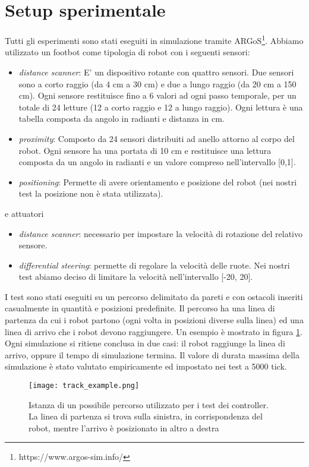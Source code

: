 \documentclass[UTF8]{article}
\begin{document}
\section{Setup sperimentale}
Tutti gli esperimenti sono stati eseguiti in simulazione tramite ARGoS\footnote{https://www.argos-sim.info/}. Abbiamo utilizzato un footbot come tipologia di robot con i seguenti sensori:
\begin{itemize}
    \item \textit{distance scanner}:  E' un dispositivo rotante con quattro sensori. Due sensori sono a corto raggio (da 4 cm a 30 cm) e due a lungo raggio (da 20 cm a 150 cm). Ogni sensore restituisce fino a 6 valori ad ogni passo temporale, per un totale di 24 letture (12 a corto raggio e 12 a lungo raggio). Ogni lettura è una tabella composta da angolo in radianti e distanza in cm. 
    \item \textit{proximity}: Composto da 24 sensori distribuiti ad anello attorno al corpo del robot. Ogni sensore ha una portata di 10 cm e restituisce una lettura composta da un angolo in radianti e un valore compreso nell'intervallo [0,1].
    \item \textit{positioning}: Permette di avere orientamento e posizione del robot (nei nostri test la posizione non è stata utilizzata).

\end{itemize}
e attuatori
\begin{itemize}
    \item \textit{distance scanner}: necessario per impostare la velocità di rotazione del relativo sensore.
    \item \textit{differential steering}: permette di regolare la velocità delle ruote. Nei nostri test abiamo deciso di limitare la velocità nell'intervallo [-20, 20].
\end{itemize}


I test sono stati eseguiti su un percorso delimitato da pareti e con ostacoli inseriti casualmente in quantità e posizioni predefinite. Il percorso ha una linea di partenza da cui i robot partono (ogni volta in posizioni diverse sulla linea) ed una linea di arrivo che i robot devono raggiungere. Un esempio è mostrato in figura \ref{fig:track_example}. Ogni simulazione si ritiene conclusa in due casi: il robot raggiunge la linea di arrivo, oppure il tempo di simulazione termina. Il valore di durata massima della simulazione è stato valutato empiricamente ed impostato nei test a 5000 tick.
\begin{figure}[h]
\centering
\texttt{[image: track\_example.png]}
\caption{Istanza di un possibile percorso utilizzato per i test dei controller. La linea di partenza si trova sulla sinistra, in corrispondenza del robot, mentre l'arrivo è posizionato in altro a destra}
\label{fig:track_example}
\end{figure}
\end{document}

